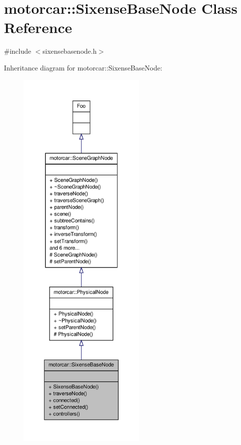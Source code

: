 \hypertarget{classmotorcar_1_1SixenseBaseNode}{\section{motorcar\-:\-:Sixense\-Base\-Node Class Reference}
\label{classmotorcar_1_1SixenseBaseNode}
}


{\ttfamily \#include $<$sixensebasenode.\-h$>$}



Inheritance diagram for motorcar\-:\-:Sixense\-Base\-Node\-:
\nopagebreak
\begin{figure}[H]
\begin{center}
\leavevmode
\includegraphics[height=550pt]{classmotorcar_1_1SixenseBaseNode__inherit__graph}
\end{center}
\end{figure}


